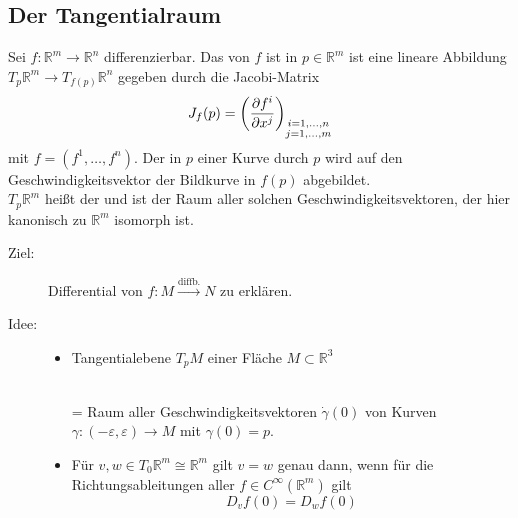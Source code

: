 \subsection{Der Tangentialraum} %
\label{sub:15}
Sei $f :  \mathds{R}^m \to \mathds{R}^n$ differenzierbar. Das  von $f$ ist in $p \in \mathds{R}^m$ ist eine lineare Abbildung 
$T_p \mathds{R}^m \to T_{f(p)} \mathds{R}^n$ gegeben durch die Jacobi-Matrix
\[
	J_f (p) = \enbrace*{\frac{\partial f^i}{\partial x^j} }_{\substack{i=1,\ldots ,n \\ j=1, \ldots , m}} 
\]
mit $f= (f^1, \ldots , f^n)$. Der  in $p$ einer Kurve durch $p$ wird auf den Geschwindigkeitsvektor der Bildkurve in $f(p)$ abgebildet.\\
$T_p \mathds{R}^m $ heißt der  und ist der Raum aller solchen Geschwindigkeitsvektoren, der hier kanonisch zu $\mathds{R}^m$ isomorph ist. 
\begin{description}
	\item[Ziel:] Differential von $f : M \xrightarrow{\text{diffb.}} N$ zu erklären. 
	\item[Idee:] \begin{itemize} \item Tangentialebene $T_p M$ einer Fläche $M \subset \mathds{R}^3$ \smallskip\\
		\begin{minipage}{13cm}
			\captionsetup{type=figure, skip=5pt}
		\end{minipage} \smallskip \\
		= Raum aller Geschwindigkeitsvektoren $\dot \gamma (0)$ von Kurven $\gamma : (-\varepsilon, \varepsilon) \to M$ mit $\gamma(0)=p$.
		\item Für $v,w \in T_0\mathds{R}^m \cong \mathds{R}^m$ gilt $v=w$ genau dann, wenn für die Richtungsableitungen aller $f \in C^\infty(\mathds{R}^m)$ gilt
		\[
			D_v f(0) = D_w f(0)
		\]
	\end{itemize}
\end{description}


